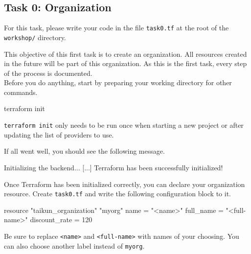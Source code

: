 \subsection{Task 0: Organization}\label{sec:task0}

\begin{note}
For this task, please write your code in the file \texttt{task0.tf}
at the root of the \texttt{workshop/} directory.
\end{note}

This objective of this first task is to create an organization.
All resources created in the future will be part of this organization.
As this is the first task, every step of the process is documented.\\

Before you do anything, start by preparing your working directory for other commands.
\begin{shell}
terraform init
\end{shell}
\begin{tip}
\texttt{terraform init} only needs to be run once when starting a new project or after updating
the list of providers to use.
\end{tip}
If all went well, you should see the following message.
\begin{raw}
Initializing the backend...
[...]
Terraform has been successfully initialized!
\end{raw}

Once Terraform has been initialized correctly, you can declare your organization resource.
Create \texttt{task0.tf} and write the following configuration block to it.
\begin{tf}
resource "taikun_organization" "myorg" {
  name          = "<name>"
  full_name     = "<full-name>"
  discount_rate = 120
}
\end{tf}
Be sure to replace \texttt{<name>} and \texttt{<full-name>} with
names of your choosing.
You can also choose another label instead of \texttt{myorg}.

